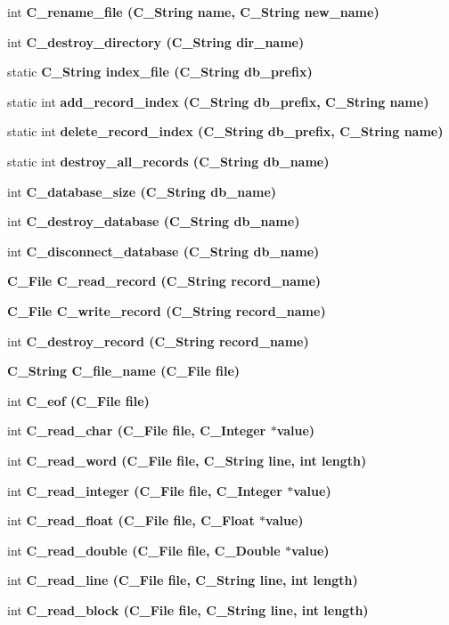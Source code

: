 \begin{CompactItemize}
\item 
int \bf{C\_\-rename\_\-file} (\bf{C\_\-String} \bf{name}, \bf{C\_\-String} new\_\-name)
\item 
int \bf{C\_\-destroy\_\-directory} (\bf{C\_\-String} dir\_\-name)
\item 
static \bf{C\_\-String} \bf{index\_\-file} (\bf{C\_\-String} \bf{db\_\-prefix})
\item 
static int \bf{add\_\-record\_\-index} (\bf{C\_\-String} \bf{db\_\-prefix}, \bf{C\_\-String} \bf{name})
\item 
static int \bf{delete\_\-record\_\-index} (\bf{C\_\-String} \bf{db\_\-prefix}, \bf{C\_\-String} \bf{name})
\item 
static int \bf{destroy\_\-all\_\-records} (\bf{C\_\-String} db\_\-name)
\item 
int \bf{C\_\-database\_\-size} (\bf{C\_\-String} db\_\-name)
\item 
int \bf{C\_\-destroy\_\-database} (\bf{C\_\-String} db\_\-name)
\item 
int \bf{C\_\-disconnect\_\-database} (\bf{C\_\-String} db\_\-name)
\item 
\bf{C\_\-File} \bf{C\_\-read\_\-record} (\bf{C\_\-String} record\_\-name)
\item 
\bf{C\_\-File} \bf{C\_\-write\_\-record} (\bf{C\_\-String} record\_\-name)
\item 
int \bf{C\_\-destroy\_\-record} (\bf{C\_\-String} record\_\-name)
\item 
\bf{C\_\-String} \bf{C\_\-file\_\-name} (\bf{C\_\-File} \bf{file})
\item 
int \bf{C\_\-eof} (\bf{C\_\-File} \bf{file})
\item 
int \bf{C\_\-read\_\-char} (\bf{C\_\-File} \bf{file}, \bf{C\_\-Integer} $\ast$value)
\item 
int \bf{C\_\-read\_\-word} (\bf{C\_\-File} \bf{file}, \bf{C\_\-String} line, int length)
\item 
int \bf{C\_\-read\_\-integer} (\bf{C\_\-File} \bf{file}, \bf{C\_\-Integer} $\ast$value)
\item 
int \bf{C\_\-read\_\-float} (\bf{C\_\-File} \bf{file}, \bf{C\_\-Float} $\ast$value)
\item 
int \bf{C\_\-read\_\-double} (\bf{C\_\-File} \bf{file}, \bf{C\_\-Double} $\ast$value)
\item 
int \bf{C\_\-read\_\-line} (\bf{C\_\-File} \bf{file}, \bf{C\_\-String} line, int length)
\item 
int \bf{C\_\-read\_\-block} (\bf{C\_\-File} \bf{file}, \bf{C\_\-String} line, int length)

\end{CompactItemize}
